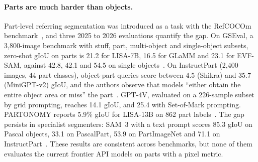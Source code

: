 \paragraph{Parts are much harder than objects.} Part-level referring segmentation was introduced as a task with the RefCOCOm benchmark~\citep{wang2024mres}, and three 2025 to 2026 evaluations quantify the gap. On GSEval, a 3{,}800-image benchmark with stuff, part, multi-object and single-object subsets, zero-shot gIoU on parts is 21.2 for LISA-7B, 16.5 for GLaMM and 23.1 for EVF-SAM, against 42.8, 42.1 and 54.5 on single objects~\citep{hu2025groundingsuite}. On InstructPart (2{,}400 images, 44 part classes), object-part queries score between 4.5 (Shikra) and 35.7 (MiniGPT-v2) gIoU, and the authors observe that models ``either obtain the entire object area or miss'' the part~\citep{wan2025instructpart}. GPT-4V, evaluated on a 226-sample subset by grid prompting, reaches 14.1 gIoU, and 25.4 with Set-of-Mark prompting. PARTONOMY reports 5.9\% gIoU for LISA-13B on 862 part labels~\citep{blume2025partonomy}. The gap persists in specialist segmenters: SAM~3 with a text prompt scores 85.3 gIoU on Pascal objects, 33.1 on PascalPart, 53.9 on PartImageNet and 71.1 on InstructPart~\citep{mehrab2026ophrg}. These results are consistent across benchmarks, but none of them evaluates the current frontier API models on parts with a pixel metric.

